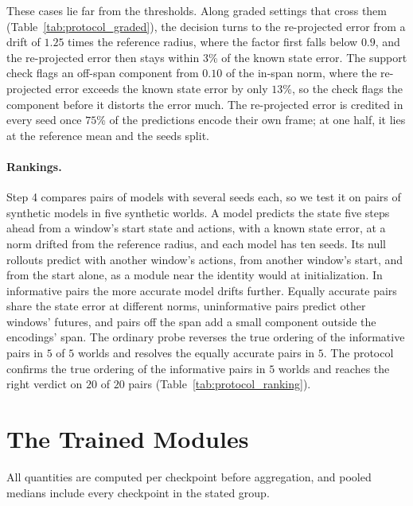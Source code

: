 These cases lie far from the thresholds. Along graded settings that cross them (Table~\ref{tab:protocol_graded}), the decision turns to the re-projected error from a drift of $1.25$ times the reference radius, where the factor first falls below $0.9$, and the re-projected error then stays within $3$\% of the known state error. The support check flags an off-span component from $0.10$ of the in-span norm, where the re-projected error exceeds the known state error by only $13$\%, so the check flags the component before it distorts the error much. The re-projected error is credited in every seed once $75$\% of the predictions encode their own frame; at one half, it lies at the reference mean and the seeds split.





\paragraph{Rankings.} Step 4 compares pairs of models with several seeds each, so we test it on pairs of synthetic models in five synthetic worlds. A model predicts the state five steps ahead from a window's start state and actions, with a known state error, at a norm drifted from the reference radius, and each model has ten seeds. Its null rollouts predict with another window's actions, from another window's start, and from the start alone, as a module near the identity would at initialization. In informative pairs the more accurate model drifts further. Equally accurate pairs share the state error at different norms, uninformative pairs predict other windows' futures, and pairs off the span add a small component outside the encodings' span. The ordinary probe reverses the true ordering of the informative pairs in $5$ of $5$ worlds and resolves the equally accurate pairs in $5$. The protocol confirms the true ordering of the informative pairs in $5$ worlds and reaches the right verdict on $20$ of $20$ pairs (Table~\ref{tab:protocol_ranking}).



\section{The Trained Modules}
\label{app:trained}
\label{app:impl}
All quantities are computed per checkpoint before aggregation, and pooled medians include every checkpoint in the stated group.

